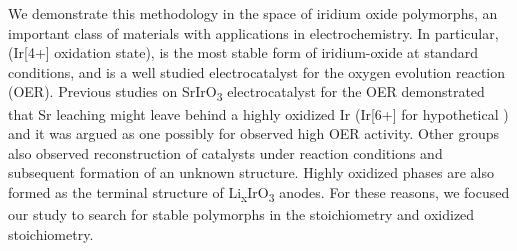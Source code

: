 We demonstrate this methodology in the space of iridium oxide polymorphs,
an important class of materials with applications in electrochemistry.
%
In particular, \rIrOtwo (Ir[4+] oxidation state), is the most stable form of iridium-oxide at standard conditions,
and is a well studied electrocatalyst for the oxygen evolution reaction (OER).
\cite{Seitz2016,Lee2012a,McCrory2015,Trotochaud2012,Danilovic2014,Carmo2013,Miles1978,Beni1979}
%
Previous studies on SrIrO\textsubscript{3} electrocatalyst for the OER demonstrated that Sr leaching might leave behind a highly oxidized Ir (Ir[6+] for hypothetical \IrOthree) and it was argued as one possibly for observed high OER activity.\cite{Seitz2016}
%
Other groups also observed reconstruction of \IrOx catalysts under reaction conditions and subsequent formation of an unknown structure. \cite{Pearce2017}
%
Highly oxidized \IrOthree phases are also formed as the terminal structure of Li\textsubscript{x}IrO\textsubscript{3} anodes.\cite{Pearce2017}
%
For these reasons, we focused our study to search for stable polymorphs in the \IrOtwo stoichiometry and  oxidized \IrOthree stoichiometry.
%
%


